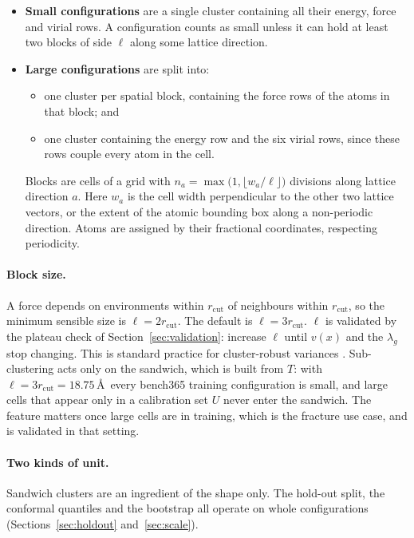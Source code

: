 \documentclass[11pt,a4paper]{article}
\begin{document}
\begin{itemize}
\item \textbf{Small configurations} are a single cluster containing all their energy, force and virial
rows. A configuration counts as small unless it can hold at least two blocks of side $\ell$ along some
lattice direction.

\item \textbf{Large configurations} are split into:
  \begin{itemize}[nosep]
  \item one cluster per spatial block, containing the force rows of the atoms in that block; and
  \item one cluster containing the energy row and the six virial rows, since these rows couple every
  atom in the cell.
  \end{itemize}
Blocks are cells of a grid with $n_a=\max\big(1,\lfloor w_a/\ell\rfloor\big)$ divisions along lattice
direction $a$. Here $w_a$ is the cell width perpendicular to the other two lattice vectors, or the
extent of the atomic bounding box along a non-periodic direction. Atoms are assigned by their
fractional coordinates, respecting periodicity.
\end{itemize}

\paragraph{Block size.} A force depends on environments within $r_{\mathrm{cut}}$ of neighbours within
$r_{\mathrm{cut}}$, so the minimum sensible size is $\ell=2r_{\mathrm{cut}}$. The default is
$\ell=3r_{\mathrm{cut}}$. $\ell$ is validated by the plateau check of Section~\ref{sec:validation}:
increase $\ell$ until $v(x)$ and the $\lambda_g$ stop changing. This is standard practice for
cluster-robust variances \cite{cameron2015}. Sub-clustering acts only on the sandwich, which is built
from $T$: with $\ell=3r_{\mathrm{cut}}=18.75$\,\AA\ every bench365 training configuration is small, and
large cells that appear only in a calibration set $U$ never enter the sandwich. The feature matters
once large cells are in training, which is the fracture use case, and is validated in that setting.



\paragraph{Two kinds of unit.} Sandwich clusters are an ingredient of the shape only. The hold-out
split, the conformal quantiles and the bootstrap all operate on whole configurations
(Sections~\ref{sec:holdout} and~\ref{sec:scale}).
\end{document}
